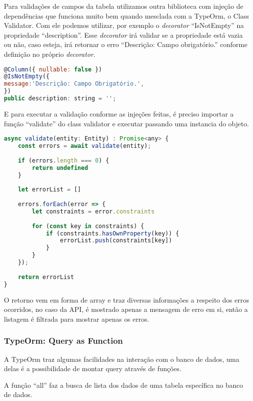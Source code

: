 Para validações de campos da tabela utilizamos outra biblioteca com injeção de dependências que funciona muito bem quando mesclada com a TypeOrm, o Class Validator.
Com ele podemos utilizar, por exemplo o \textit{decorator} ``IsNotEmpty'' na propriedade ``description''. Esse \textit{decorator} irá validar se a propriedade está vazia ou não, caso esteja, irá retornar o erro ``Descrição: Campo obrigatório.'' conforme definição no próprio \textit{decorator}.

\begin{lstlisting}[language=JavaScript, caption={Definição de validação de propriedades com o Class Validator}]
@Column({ nullable: false })
@IsNotEmpty({
message:'Descrição: Campo Obrigatório.',
})
public description: string = '';
\end{lstlisting}

E para executar a validação conforme as injeções feitas, é preciso importar a função ``validate'' do class validator e executar passando uma instancia do objeto.

\begin{lstlisting}[language=JavaScript, caption={Validação de Objetos com o Class Validator}]
async validate(entity: Entity) : Promise<any> {
	const errors = await validate(entity);
	
	if (errors.length === 0) {
		return undefined
	}
	
	let errorList = []
	
	errors.forEach(error => {
		let constraints = error.constraints
		
		for (const key in constraints) {
			if (constraints.hasOwnProperty(key)) {
				errorList.push(constraints[key])
			}
		}
	});
	
	return errorList
}
\end{lstlisting}

O retorno vem em forma de array e traz diversas informações a respeito dos erros ocorridos, no caso da API, é mostrado apenas a mensagem de erro em si, então a listagem é filtrada para mostrar apenas os erros.

\subsubsection{TypeOrm: Query as Function}

A TypeOrm traz algumas facilidades na interação com o banco de dados, uma delas é a possibilidade de montar query através de funções.

A função ``all'' faz a busca de lista dos dados de uma tabela específica no banco de dados.

